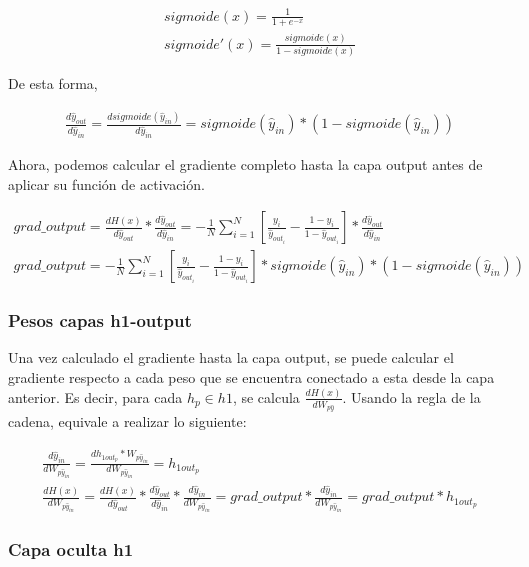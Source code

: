 \begin{gather}
	sigmoide(x) = \frac{1}{1+e^{-x}} \\
	sigmoide'(x) = \frac{sigmoide(x)}{1-sigmoide(x)}
\end{gather}

De esta forma,

\begin{gather}
	\frac{d\hat{y}_{out}}{d\hat{y}_{in}} = \frac{d sigmoide(\hat{y}_{in})}{d\hat{y}_{in}} = sigmoide(\hat{y}_{in})*(1-sigmoide(\hat{y}_{in}))
\end{gather}

Ahora, podemos calcular el gradiente completo hasta la capa output antes de aplicar su función de activación.

\begin{gather}
	grad\_output = \frac{dH(x)}{d\hat{y}_{out}} * \frac{d\hat{y}_{out}}{d\hat{y}_{in}} =
	- \frac{1}{N} \sum_{i=1}^{N}  [ \frac{y_i}{\hat{y}_{out_i}} - \frac{1-y_i}{1-\hat{y}_{out_i}} ] * \frac{d\hat{y}_{out}}{d\hat{y}_{in}} \\
	grad\_output = - \frac{1}{N} \sum_{i=1}^{N}  [ \frac{y_i}{\hat{y}_{out_i}} - \frac{1-y_i}{1-\hat{y}_{out_i}} ] * sigmoide(\hat{y}_{in})*(1-sigmoide(\hat{y}_{in}))
\end{gather}

\subsubsection{Pesos capas h1-output}

Una vez calculado el gradiente hasta la capa output, se puede calcular el gradiente respecto a cada peso que se encuentra conectado a esta desde la capa anterior. Es decir, para cada $h_p\in h1$, se calcula $\frac{dH(x)}{dW_{p\hat{y}}}$. Usando la regla de la cadena, equivale a realizar lo siguiente:

\begin{gather}
	\frac{d\hat{y}_{in}}{dW_{p\hat{y}_{in} }} = \frac{dh_{1out_p} * W_{p\hat{y}_{in} }}{dW_{p\hat{y}_{in} }} = h_{1out_p} \\
	\frac{dH(x)}{dW_{p\hat{y}_{in} }} = \frac{dH(x)}{d\hat{y}_{out}} * \frac{d\hat{y}_{out}}{d\hat{y}_{in}} * \frac{d\hat{y}_{in}}{dW_{p\hat{y}_{in} }} =  grad\_output * \frac{d\hat{y}_{in}}{dW_{p\hat{y}_{in} }} = grad\_output * h_{1out_p}
\end{gather}

\subsubsection{Capa oculta h1}


